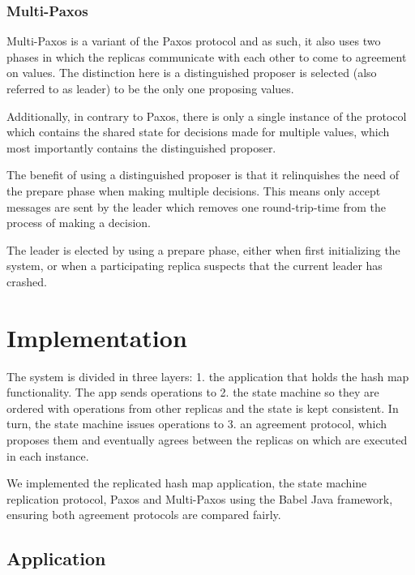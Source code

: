 \documentclass[sigconf]{acmart}
\begin{document}
\subsubsection{Multi-Paxos}


Multi-Paxos is a variant of the Paxos protocol and as such, it also uses two phases in which the replicas communicate with each other to come to agreement on values. The distinction here is a distinguished proposer is selected (also referred to as leader) to be the only one proposing values.

Additionally, in contrary to Paxos, there is only a single instance of the protocol which contains the shared state for decisions made for multiple values, which most importantly contains the distinguished proposer.

The benefit of using a distinguished proposer is that it relinquishes the need of the prepare phase when making multiple decisions. This means only accept messages are sent by the leader which removes one round-trip-time from the process of making a decision.

The leader is elected by using a prepare phase, either when first initializing the system, or when a participating replica suspects that the current leader has crashed.


\section{Implementation}

The system is divided in three layers: 1. the application that holds the hash map functionality. The app sends operations to 2. the state machine so they are ordered with operations from other replicas and the state is kept consistent. In turn, the state machine issues operations to 3. an agreement protocol, which proposes them and eventually agrees between the replicas on which are executed in each instance.

We implemented the replicated hash map application, the state machine replication protocol, Paxos and Multi-Paxos using the Babel Java framework, ensuring both agreement protocols are compared fairly.

\subsection{Application}
\end{document}
